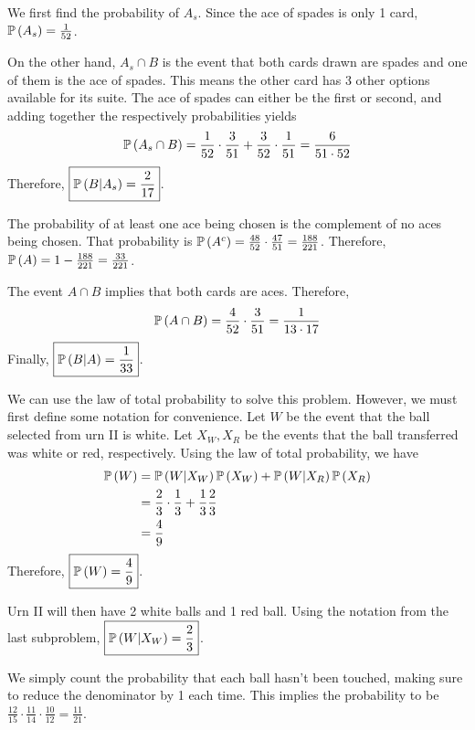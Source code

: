 \documentclass{article}
\begin{document}
 
\setcounter{problem}{10}
\problem{}

\subproblema{}
We first find the probability of $A_s$.
Since the ace of spades is only 1 card,
$\mathbb{P} \left ( A_s \right) = \frac{1}{52}$.

On the other hand,
$A_s \cap B$ is the event that both cards drawn are spades and one of them is the ace of spades.
This means the other card has 3 other options available for its suite.
The ace of spades can either be the first or second,
and adding together the respectively probabilities yields
$$\mathbb{P} \left ( A_s \cap B \right) = \frac{1}{52} \cdot \frac{3}{51} + \frac{3}{52} \cdot \frac{1}{51} = \frac{6}{51 \cdot 52}$$
Therefore, $\boxed{\mathbb{P} \left ( B \vert A_s \right) = \frac{2}{17}}$.

\subproblema{}
The probability of at least one ace being chosen is the complement of no aces being chosen.
That probability is $\mathbb{P} \left ( A^c \right) = \frac{48}{52} \cdot \frac{47}{51} = \frac{188}{221}$.
Therefore, $\mathbb{P} \left ( A \right) = 1 - \frac{188}{221} = \frac{33}{221}$.

The event $A \cap B$ implies that both cards are aces.
Therefore, $$ \mathbb{P} \left ( A \cap B \right) = \frac{4}{52} \cdot \frac{3}{51} = \frac{1}{13 \cdot 17} $$
Finally, $\boxed{\mathbb{P} \left ( B \vert A \right) = \frac{1}{33}}$.


\setcounter{problem}{23}
\problem{}
\subproblema{}
We can use the law of total probability to solve this problem.
However,
we must first define some notation for convenience.
Let $W$ be the event that the ball selected from urn II is white.
Let $X_W, X_R$ be the events that the ball transferred was white or red,
respectively.
Using the law of total probability,
we have
\begin{align*}
  \mathbb{P} \left ( W \right) &= \mathbb{P} \left ( W \vert X_W \right) \mathbb{P} \left ( X_W \right) + \mathbb{P} \left ( W \vert X_R \right) \mathbb{P} \left ( X_R \right) \\
         &= \frac{2}{3} \cdot \frac{1}{3} + \frac{1}{3} \frac{2}{3} \\
         &= \frac{4}{9} \\
\end{align*}
Therefore, $\boxed{\mathbb{P} \left ( W \right) = \frac{4}{9}}$.

\subproblema{}
Urn II will then have 2 white balls and 1 red ball.
Using the notation from the last subproblem,
$\boxed{\mathbb{P} \left ( W \vert X_W \right) = \frac{2}{3}}$.

\setcounter{problem}{30}
\problem{}
We simply count the probability that each ball hasn't been touched,
making sure to reduce the denominator by 1 each time.
This implies the probability to be $\frac{12}{15} \cdot \frac{11}{14} \cdot \frac{10}{12} = \boxed{\frac{11}{21}}$.
\end{document}
